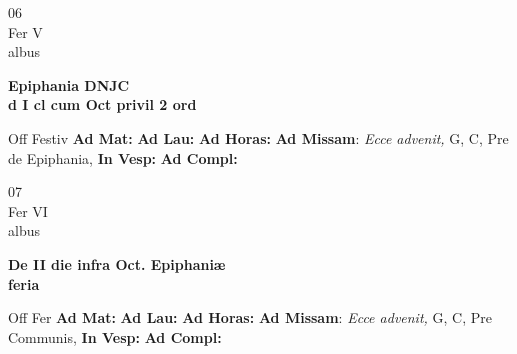 \documentclass[10pt, openany]{book}
\begin{document}
        \begin{center}
            \begin{minipage}{3.5in}
                \vspace{2em}
                \begin{minipage}{0.5in}
                    {\Huge 06} \\
                    {\normalsize Fer V} \\
                    {\normalsize albus}
                \end{minipage}
                \begin{minipage}{3.0in}
                    \textbf{ \large Epiphania DNJC \\
                    \textnormal{\normalsize d I cl cum Oct privil 2 ord}} \\ 
                \end{minipage}
                \begin{justify}Off Festiv
                    \textbf{Ad Mat: }
                    \textbf{Ad Lau: }
                    \textbf{Ad Horas: }\textbf{Ad Missam}: \textit{Ecce advenit,} G, C, Pre de Epiphania,  
                    \textbf{In Vesp: }
                    \textbf{Ad Compl: }
                \end{justify}
            \end{minipage}
        \end{center}
    
        \begin{center}
            \begin{minipage}{3.5in}
                \vspace{2em}
                \begin{minipage}{0.5in}
                    {\Huge 07} \\
                    {\normalsize Fer VI} \\
                    {\normalsize albus}
                \end{minipage}
                \begin{minipage}{3.0in}
                    \textbf{ \large De II die infra Oct. Epiphaniæ \\
                    \textnormal{\normalsize feria}} \\ 
                \end{minipage}
                \begin{justify}Off Fer
                    \textbf{Ad Mat: }
                    \textbf{Ad Lau: }
                    \textbf{Ad Horas: }\textbf{Ad Missam}: \textit{Ecce advenit,} G, C, Pre Communis,  
                    \textbf{In Vesp: }
                    \textbf{Ad Compl: }
                \end{justify}
            \end{minipage}
        \end{center}
    
\end{document}
